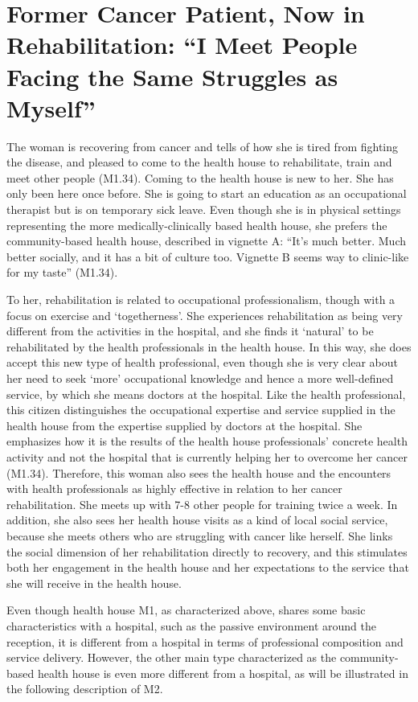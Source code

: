 \section{Former Cancer Patient, Now in Rehabilitation: “I Meet People Facing the Same Struggles as Myself”}
The woman is recovering from cancer and tells of how she is tired from fighting the disease, and pleased to come to the health house to rehabilitate, train and meet other people (M1.34). Coming to the health house is new to her. She has only been here once before. She is going to start an education as an occupational therapist but is on temporary sick leave. Even though she is in physical settings representing the more medically-clinically based health house, she prefers the community-based health house, described in vignette A: “It's much better. Much better socially, and it has a bit of culture too. Vignette B seems way to clinic-like for my taste” (M1.34). 
\par
To her, rehabilitation is related to occupational professionalism, though with a focus on exercise and ‘togetherness’. She experiences rehabilitation as being very different from the activities in the hospital, and she finds it ‘natural’ to be rehabilitated by the health professionals in the health house. In this way, she does accept this new type of health professional, even though she is very clear about her need to seek ‘more’ occupational knowledge and hence a more well-defined service, by which she means doctors at the hospital. Like the health professional, this citizen distinguishes the occupational expertise and service supplied in the health house from the expertise supplied by doctors at the hospital. She emphasizes how it is the results of the health house professionals’ concrete health activity and not the hospital that is currently helping her to overcome her cancer (M1.34). Therefore, this woman also sees the health house and the encounters with health professionals as highly effective in relation to her cancer rehabilitation. She meets up with 7-8 other people for training twice a week. In addition, she also sees her health house visits as a kind of local social service, because she meets others who are struggling with cancer like herself. She links the social dimension of her rehabilitation directly to recovery, and this stimulates both her engagement in the health house and her expectations to the service that she will receive in the health house.
\par
Even though health house M1, as characterized above, shares some basic characteristics with a hospital, such as the passive environment around the reception, it is different from a hospital in terms of professional composition and service delivery. However, the other main type characterized as the community-based health house is even more different from a hospital, as will be illustrated in the following description of M2. 


